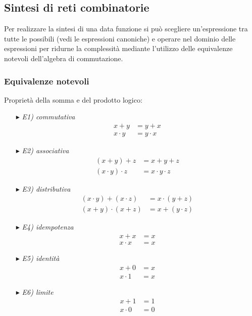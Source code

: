 \documentclass{article}
\begin{document}
\subsection{Sintesi di reti combinatorie}
Per realizzare la sintesi di una data funzione si può scegliere un'espressione tra tutte le possibili (vedi le espressioni canoniche) e operare nel dominio delle espressioni per ridurne la complessità mediante l'utilizzo delle equivalenze notevoli dell'algebra di commutazione.
\subsubsection{Equivalenze notevoli}
Proprietà della somma e del prodotto logico:
\begin{itemize}
    \item [$\blacktriangleright$] \textit{E1) commutativa} 
    \begin{align*}
        x+y &= y+x\\
        x \cdot y  &= y \cdot x
    \end{align*}
    \item [$\blacktriangleright$] \textit{E2) associativa}
    \begin{align*}
        (x+y)+z &= x+y+z\\
        (x \cdot y) \cdot z &= x \cdot y \cdot z
    \end{align*}
    \item [$\blacktriangleright$] \textit{E3) distributiva}
    \begin{align*}
        (x \cdot y) + (x \cdot z) &= x \cdot (y + z)\\
        (x+y)\cdot (x+z) &= x + (y \cdot z)
    \end{align*}
    \item [$\blacktriangleright$] \textit{E4) idempotenza}
    \begin{align*}
        x + x &= x\\
        x \cdot x &= x
    \end{align*}
    \item [$\blacktriangleright$] \textit{E5) identità}
    \begin{align*}
        x+0 &= x\\
        x \cdot 1 &= x
    \end{align*}
    \item [$\blacktriangleright$] \textit{E6) limite}
    \begin{align*}
        x+1 &= 1\\
        x \cdot 0 &= 0
    \end{align*}
\end{itemize}
\end{document}
